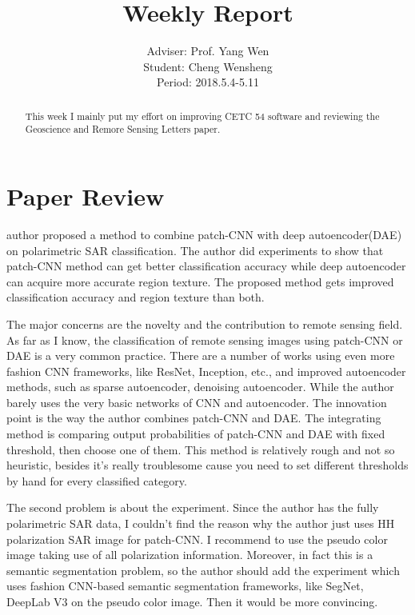 \documentclass[]{IEEEtran}
\begin{document}
	\title{Weekly Report}
	\author{Adviser: Prof. Yang Wen \\Student: Cheng Wensheng\\ Period: 2018.5.4-5.11
	}
	\maketitle

\begin{abstract}
	This week I mainly put my effort on improving CETC 54 software and reviewing the Geoscience and Remore Sensing Letters paper.
\end{abstract}

\section{Paper Review}
	 author proposed a method to combine patch-CNN with deep autoencoder(DAE) on polarimetric SAR classification. The author did experiments to show that patch-CNN method can get better classification accuracy while deep autoencoder can acquire more accurate region texture. The proposed method gets improved classification accuracy and region texture than both.
	
	The major concerns are the novelty and the contribution to remote sensing field. As far as I know, the classification of remote sensing images using patch-CNN or DAE is a very common practice. There are a number of works using even more fashion CNN frameworks, like ResNet, Inception, etc., and improved autoencoder methods, such as sparse autoencoder, denoising autoencoder. While the author barely uses the very basic networks of CNN and autoencoder. The innovation point is the way the author combines patch-CNN and DAE. The integrating method is comparing output probabilities of patch-CNN and DAE with fixed threshold, then choose one of them. This method is relatively rough and not so heuristic, besides it’s really troublesome cause you need to set different thresholds by hand for every classified category. 
	
	The second problem is about the experiment. Since the author has the fully polarimetric SAR data, I couldn’t find the reason why the author just uses HH polarization SAR image for patch-CNN. I recommend to use the pseudo color image taking use of all polarization information. Moreover, in fact this is a semantic segmentation problem, so the author should add the experiment which uses fashion CNN-based semantic segmentation frameworks, like SegNet, DeepLab V3 on the pseudo color image. Then it would be more convincing. 
	
\end{document}
